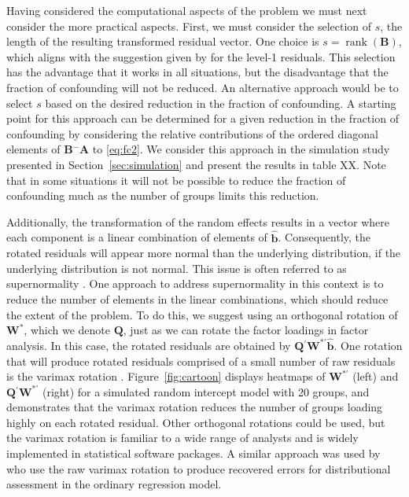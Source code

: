 \documentclass{article} %
\newcommand{\ginv}{\ensuremath{^{-}}}
\newcommand{\trans}{\ensuremath{^\prime}}
\DeclareMathOperator{\rank}{rank}
\begin{document}
Having considered the computational aspects of the problem we must next consider the more practical aspects. First, we must consider the selection of $s$,  the length of the resulting transformed residual vector. One choice is $s = \rank(\bm{B})$, which aligns with the suggestion given by \cite{HildenMinton:1995wh} for the level-1 residuals. This selection has the advantage that it works in all situations, but the disadvantage that the fraction of confounding will not be reduced. An alternative approach would be to select $s$ based on the desired reduction in the fraction of confounding. A starting point for this approach can be determined for a given reduction in the fraction of confounding by considering the relative contributions of the ordered diagonal elements of $\bm{B}\ginv\bm{A}$ to \eqref{eq:fc2}. We consider this approach in the simulation study presented in Section~\ref{sec:simulation} and present the results in table XX. Note that in some situations it will not be possible to reduce the fraction of confounding much as the number of groups limits this reduction.

Additionally, the transformation of the random effects results in a vector where each component is a linear combination of elements of $\widehat{\bm{b}}$. Consequently, the rotated residuals will appear more normal than the underlying distribution, if the underlying distribution is not normal. This issue is often referred to as supernormality \citep{Atkinson:1985}. One approach to address supernormality in this context is to reduce the number of elements in the linear combinations, which should reduce the extent of the problem. To do this, we suggest using an orthogonal rotation of $\bm{W}^*$, which we denote $\bm{Q}$, just as we can rotate the factor loadings in factor analysis. In this case, the rotated residuals are obtained by $\bm{Q}\trans \bm{W}^{*\prime} \widehat{\bm{b}}$. One rotation that will produce rotated residuals comprised of a small number of raw residuals is the varimax rotation \citep{Johnson:2007}. Figure~\ref{fig:cartoon} displays heatmaps of $\bm{W}^{*\prime}$ (left) and $\bm{Q}\trans\bm{W}^{*\prime}$ (right) for a simulated random intercept model with 20 groups, and demonstrates that the varimax rotation reduces the number of groups loading highly on each rotated residual.  Other orthogonal rotations could be used, but the varimax rotation is familiar to a wide range of analysts and is widely implemented in statistical software packages. A similar approach was used by \cite{Jensen:1999iu} who use the raw varimax rotation to produce recovered errors for distributional assessment in the ordinary regression model.
\end{document}
